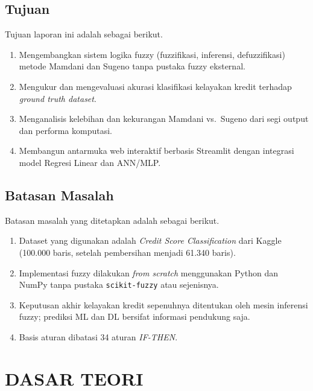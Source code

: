 \documentclass[12pt,a4paper]{report}
\begin{document}
\section{Tujuan}

Tujuan laporan ini adalah sebagai berikut.
\begin{enumerate}[label=\arabic*.]
  \item Mengembangkan sistem logika fuzzy (fuzzifikasi, inferensi,
        defuzzifikasi) metode Mamdani dan Sugeno tanpa pustaka
        fuzzy eksternal.
  \item Mengukur dan mengevaluasi akurasi klasifikasi kelayakan
        kredit terhadap \textit{ground truth dataset}.
  \item Menganalisis kelebihan dan kekurangan Mamdani vs.\ Sugeno
        dari segi output dan performa komputasi.
  \item Membangun antarmuka web interaktif berbasis Streamlit
        dengan integrasi model Regresi Linear dan ANN/MLP.
\end{enumerate}

\section{Batasan Masalah}

Batasan masalah yang ditetapkan adalah sebagai berikut.
\begin{enumerate}[label=\arabic*.]
  \item Dataset yang digunakan adalah \textit{Credit Score
        Classification} dari Kaggle (100.000 baris, setelah
        pembersihan menjadi 61.340 baris).
  \item Implementasi fuzzy dilakukan \textit{from scratch}
        menggunakan Python dan NumPy tanpa pustaka
        \texttt{scikit-fuzzy} atau sejenisnya.
  \item Keputusan akhir kelayakan kredit sepenuhnya ditentukan
        oleh mesin inferensi fuzzy; prediksi ML dan DL bersifat
        informasi pendukung saja.
  \item Basis aturan dibatasi 34 aturan \textit{IF-THEN}.
\end{enumerate}

\chapter{DASAR TEORI}
\end{document}
